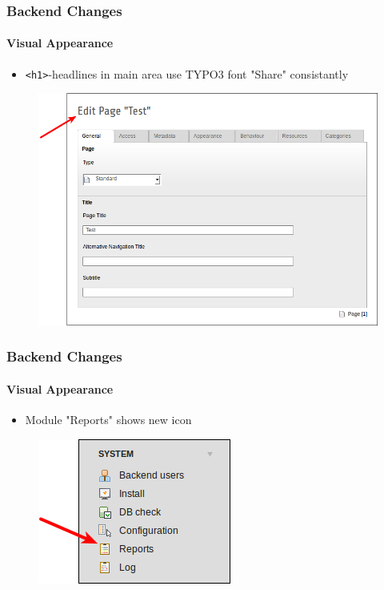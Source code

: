 
\begin{frame}[fragile]
	\frametitle{Backend Changes}
	\framesubtitle{Visual Appearance}

	\begin{itemize}
		\item \texttt{<h1>}-headlines in main area use TYPO3 font "Share" consistantly
	\end{itemize}

	\begin{figure}
		\includegraphics[width=0.6\linewidth]{Images/BackendChanges/ConsistantFont.png}
	\end{figure}

\end{frame}


\begin{frame}[fragile]
	\frametitle{Backend Changes}
	\framesubtitle{Visual Appearance}

	\begin{itemize}
		\item Module "Reports" shows new icon
	\end{itemize}

	\begin{figure}
		\includegraphics[width=0.35\linewidth]{Images/BackendChanges/ModuleReportsIcon.png}
	\end{figure}

\end{frame}


